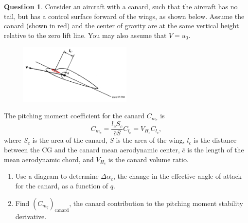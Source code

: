 \documentclass{article}
\theoremstyle{definition}
\newtheorem{question}{Question}
\begin{document}
\vspace{0.1cm}

\clearpage

\begin{question}
    Consider an aircraft with a canard, such that the aircraft has no tail, but has a control surface forward of the wings, as shown below. Assume the canard (shown in red) and the center of gravity are at the same vertical height relative to the zero lift line. You may also assume that $V=u_0$.

    \begin{figure}[h]
        \centering
        \includegraphics[width=0.5\textwidth]{canard.png}
        \label{fig:canard}
    \end{figure}

    The pitching moment coefficient for the canard $C_{m_c}$ is
    \begin{equation*}
        C_{m_c} = \frac{l_cS_c}{\bar{c}S}C_{l_c}=V_{H_c}C_{l_c},
    \end{equation*}
    where $S_c$ is the area of the canard, $S$ is the area of the wing, $l_c$ is the distance between the CG and the canard mean aerodynamic center, $\bar{c}$ is the length of the mean aerodynamic chord, and $V_{H_c}$ is the canard volume ratio.

\begin{enumerate}
    \item Use a diagram to determine $\Delta \alpha_c$, the change in the effective angle of attack for the canard, as a function of $q$.
    \item Find $(C_{m_q})_{\text{canard}}$, the canard contribution to the pitching moment stability derivative.
\end{enumerate}

\end{question}

\vspace{0.1cm}
\end{document}
